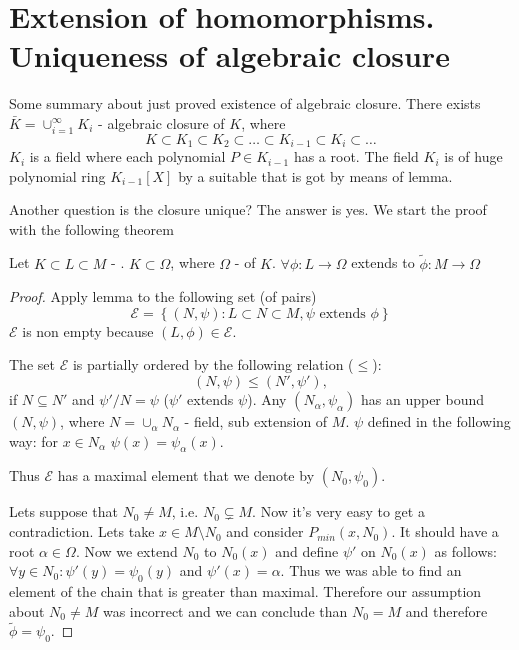 \section{Extension of homomorphisms. Uniqueness of algebraic closure}

Some summary about just proved existence of algebraic closure. There
exists $\bar{K} = \cup_{i=1}^\infty K_i$ - algebraic closure of $K$,
where
\[
K \subset K_1 \subset K_2 \subset \dots \subset K_{i-1} \subset K_i
\subset \dots
\]
$K_i$ is a field where each polynomial $P \in K_{i-1}$ has a root. The
field $K_i$ is  of huge polynomial ring
$K_{i-1}\left[X\right]$ by a suitable  that is
got by means of  lemma.

Another question is the closure unique? The answer is yes. We start
the proof with the following theorem 

\begin{theorem}
  Let $K \subset L \subset M$ - .
  $K \subset \Omega$, where $\Omega$ - 
  of $K$.
  $\forall \phi: L \to \Omega$ extends to $\widetilde{\phi}: M \to
  \Omega$
  \begin{proof}
    Apply  lemma to the following set (of pairs)
    \[
    \mathcal{E} = \left\{
    \left(N, \psi\right): L \subset N \subset M, \psi \mbox{ extends }
    \phi 
    \right\}
    \]
    $\mathcal{E}$ is non empty because $\left(L,\phi\right) \in
    \mathcal{E}$.

    The set $\mathcal{E}$ is partially ordered by the following
    relation ($\le$):
    \[
    \left(N, \psi\right) \le \left(N', \psi'\right),
    \]
    if $N \subseteq N'$ and $\psi'/N = \psi$ ($\psi'$ extends $\psi$).
    Any  $\left(N_\alpha, \psi_\alpha\right)$
    has an upper bound $\left(N, \psi\right)$, where
    \(
    N = \cup_\alpha N_\alpha
    \) - field, sub extension of $M$. $\psi$ defined in the following
    way: for $x \in N_\alpha$ $\psi(x) = \psi_\alpha(x)$.

    Thus $\mathcal{E}$ has a maximal element that we denote by
    $\left(N_0, \psi_0\right)$.

    Lets suppose that $N_0 \ne M$, i.e.
    $N_0 \subsetneq M$. Now it's very easy to get a
    contradiction. Lets take $x \in M \setminus N_0$ and consider
     $P_{min}\left(x, N_0\right)$. It
    should have a root $\alpha \in \Omega$. Now we extend $N_0$ to
    $N_0\left(x\right)$ and define $\psi'$ on
    $N_0\left(x\right)$ as follows: $\forall y \in N_0: \psi'(y)
    = \psi_0(y)$ and $\psi'(x) = \alpha$. Thus we was able to find an
    element of the chain that is greater than maximal. Therefore our
    assumption about $N_0 \ne M$ was incorrect and we can conclude
    than $N_0 = M$ and therefore $\tilde{\phi} = \psi_0$. 
  \end{proof}
  \label{thm:lec2_3}
\end{theorem}

